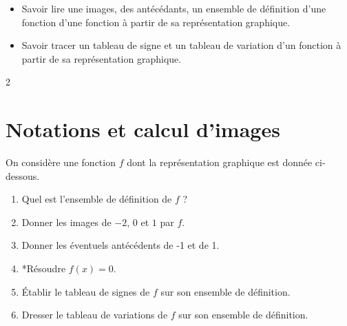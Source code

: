 \documentclass[10pt,a4paper]{article}
\begin{document}

\vspace{-0.3cm}

\begin{prerequis}
\begin{itemize}
    \item Savoir lire une images, des antécédants, un ensemble de définition d'une fonction d'une fonction à partir de sa représentation graphique.
    \item Savoir tracer un tableau de signe et un tableau de variation d'un fonction à partir de sa représentation graphique.
\end{itemize}
\end{prerequis}

\begin{multicols}{2}

\section{Notations et calcul d'images}

\begin{exo}[Rappels][]
On considère une fonction \(f\) dont la représentation graphique est donnée ci-dessous.


\begin{enumerate}[leftmargin=*]
    \item Quel est l'ensemble de définition de \(f\) ?
    \item Donner les images de \(-2\), \(0\) et \(1\) par \(f\).
    \item Donner les éventuels antécédents de -1 et de 1.
    \item *Résoudre \(f(x)=0\).
    \item Établir le tableau de signes de \(f\) sur son ensemble de définition.
    \item Dresser le tableau de variations de \(f\) sur son ensemble de définition.
\end{enumerate}
\end{exo}


\end{multicols}
\end{document}
